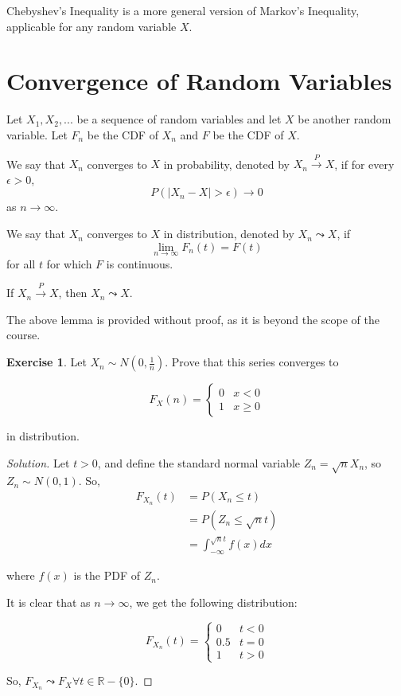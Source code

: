 \documentclass[12pt,letterpaper]{amsbook}
\theoremstyle{definition}
\newtheorem*{exercise}{Exercise}
\newenvironment{solution}
  {\renewcommand\qedsymbol{$\blacksquare$}\begin{proof}[Solution]}
  {\end{proof}}
\newcommand{\R}{\mathbb{R}}
\begin{document}
Chebyshev's Inequality is a more general version of Markov's Inequality, applicable for any random variable $X$.

\section{Convergence of Random Variables}

Let $X_1,X_2,...$ be a sequence of random variables and let $X$ be another random variable. Let $F_n$ be the CDF of $X_n$ and $F$ be the CDF of $X$.

We say that $X_n$ converges to $X$ in probability, denoted by $X_n \xrightarrow{P} X$, if for every $\epsilon > 0$,
\[P(|X_n-X| > \epsilon) \rightarrow 0\]
as $n \rightarrow \infty$.

We say that $X_n$ converges to $X$ in distribution, denoted by $X_n \leadsto X$, if
\[ \lim_{n \rightarrow \infty} F_n(t) = F(t)\]
for all $t$ for which $F$ is continuous.

\begin{lemma}
  If $X_n \xrightarrow{P} X$, then $X_n \leadsto X$.
\end{lemma}

The above lemma is provided without proof, as it is beyond the scope of the course.

\begin{exercise}

Let $X_n \sim N(0,\frac{1}{n})$. Prove that this series converges to 

\[ F_X(n) = \begin{cases}
0 & x < 0 \\
1 & x \geq 0
\end{cases}\]

in distribution. 

\begin{solution}
Let $t > 0$, and define the standard normal variable $Z_n = \sqrt{n}X_n$, so $Z_n \sim N(0,1)$. So,
\begin{align*}
  F_{X_n}(t) &= P(X_n \leq t) \\
             &= P(Z_n \leq \sqrt{n}t) \\
             &= \int_{-\infty} ^{\sqrt{n}t} f(x) dx
\end{align*}

where $f(x)$ is the PDF of $Z_n$.

It is clear that as $n \rightarrow \infty$, we get the following distribution:

\[F_{X_n}(t) = \begin{cases}
  0 & t < 0 \\
  0.5 & t = 0 \\
  1 & t > 0
\end{cases}\]

So, $F_{X_n} \leadsto F_X \forall t \in \R - \{0\}$.
\end{solution}
\end{exercise}
\end{document}
